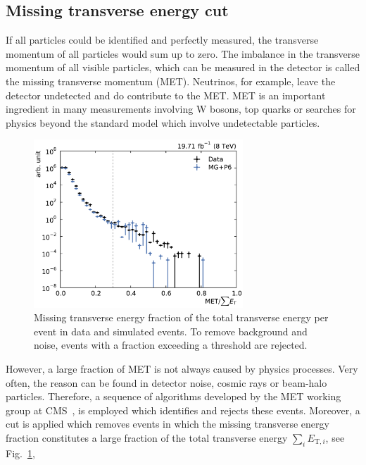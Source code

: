\subsection{Missing transverse energy cut}

If all particles could be identified and perfectly measured, the transverse
momentum of all particles would sum up to zero. The imbalance in the transverse
momentum of all visible particles, which can be measured in the detector is
called the missing transverse momentum (MET). Neutrinos, for example, leave the
detector undetected and do contribute to the MET. MET is an important ingredient
in many measurements involving W bosons, top quarks or searches for physics
beyond the standard model which involve undetectable particles. 

\begin{figure}[htbp]
    \centering
    \includegraphics[width=0.7\textwidth]{figures/measurement/metoversumet.pdf}
    \caption[Missing transverse energy distribution]{Missing transverse energy
    fraction of the total transverse energy per event in data and simulated
    events. To remove background and noise, events with a fraction exceeding a
    threshold are rejected. }
    \label{fig:mc:met_fraction}
\end{figure}

However, a large fraction of MET is not always caused by physics processes. Very
often, the reason can be found in detector noise, cosmic rays or beam-halo
particles. Therefore, a sequence of algorithms developed by the MET working
group at CMS~\cite{jetmet:metfilters}, is employed which identifies and rejects
these events.  Moreover, a cut is applied which removes events in which the
missing transverse energy fraction \met constitutes a large fraction of the
total transverse energy $\sum_i E_{\mathrm{T},i}$, see
Fig.~\ref{fig:mc:met_fraction},

